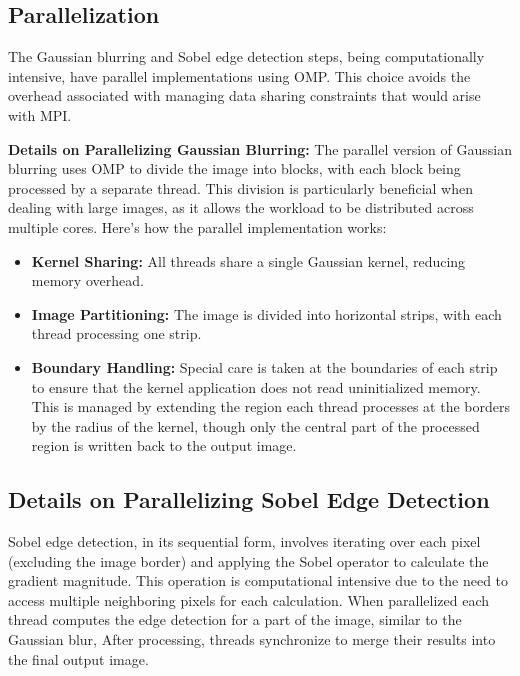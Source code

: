 \documentclass[conference]{IEEEtran}
\begin{document}
    \subsection{Parallelization}
    \label{sec:parallelization}
    
        The Gaussian blurring and Sobel edge detection steps, being computationally intensive, have parallel implementations using OMP. This choice avoids the overhead associated with managing data sharing constraints that would arise with MPI.
        
        \textbf{Details on Parallelizing Gaussian Blurring:}
        The parallel version of Gaussian blurring uses OMP to divide the image into blocks, with each block being processed by a separate thread. This division is particularly beneficial when dealing with large images, as it allows the workload to be distributed across multiple cores. Here's how the parallel implementation works:
        
        \begin{itemize}
            \item \textbf{Kernel Sharing:} All threads share a single Gaussian kernel, reducing memory overhead.
            \item \textbf{Image Partitioning:} The image is divided into horizontal strips, with each thread processing one strip.
            \item \textbf{Boundary Handling:} Special care is taken at the boundaries of each strip to ensure that the kernel application does not read uninitialized memory. This is managed by extending the region each thread processes at the borders by the radius of the kernel, though only the central part of the processed region is written back to the output image.
        \end{itemize}
        
    \subsection{Details on Parallelizing Sobel Edge Detection}
    \label{sec:parallel_sobel}
    
        Sobel edge detection, in its sequential form, involves iterating over each pixel (excluding the image border) and applying the Sobel operator to calculate the gradient magnitude. This operation is computational intensive due to the need to access multiple neighboring pixels for each calculation. When parallelized each thread computes the edge detection for a part of the image, similar to the Gaussian blur, After processing, threads synchronize to merge their results into the final output image.
        
\end{document}

